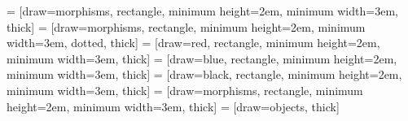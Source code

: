 
\usepackage{tikz}


\usetikzlibrary{positioning,
  intersections,
  hobby,
  patterns,
  calc,
  decorations.pathmorphing,
  decorations.markings,
  shadows,
  shapes,
  cd,
  decorations.markings,
  positioning,
  arrows.meta,
  shapes,
  calc,
  fit,
  quotes,
backgrounds}

\usepackage{tikzpagenodes}



 = [draw=morphisms, rectangle, minimum height=2em, minimum width=3em, thick]
 = [draw=morphisms, rectangle, minimum height=2em, minimum width=3em, dotted, thick]
 = [draw=red, rectangle, minimum height=2em, minimum width=3em, thick]
 = [draw=blue, rectangle, minimum height=2em, minimum width=3em, thick]
 = [draw=black, rectangle, minimum height=2em, minimum width=3em, thick]
 = [draw=morphisms, rectangle, minimum height=2em, minimum width=3em, thick]
 = [draw=objects, thick]




\def\preceqSize{10pt}
\newcommand{\hasselinewidth}{2mm}


